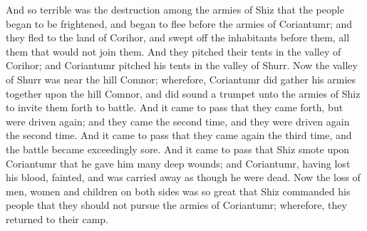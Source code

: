 And so terrible was the destruction among the armies of Shiz that the people began to be frightened, and began to flee before the armies of Coriantumr; and they fled to the land of Corihor, and swept off the inhabitants before them, all them that would not join them.
\bverse \iffalse And they pitched their tents in the valley of Corihor; and Coriantumr pitched his tents in the valley of Shurr. Now the valley of Shurr was near the hill Comnor; wherefore, Coriantumr did gather his armies together upon the hill Comnor, and did sound a trumpet unto the armies of Shiz to invite them forth to battle. \fi
And they pitched their tents in the valley of Corihor; and Coriantumr pitched his tents in the valley of Shurr. Now the valley of Shurr was near the hill Comnor; wherefore, Coriantumr did gather his armies together upon the hill Comnor, and did sound a trumpet unto the armies of Shiz to invite them forth to battle.
\bverse \iffalse And it came to pass that they came forth, but were driven again; and they came the second time, and they were driven again the second time. And it came to pass that they came again the third time, and the battle became exceedingly sore. \fi
And it came to pass that they came forth, but were driven again; and they came the second time, and they were driven again the second time. And it came to pass that they came again the third time, and the battle became exceedingly sore.
\bverse \iffalse And it came to pass that Shiz smote upon Coriantumr that he gave him many deep wounds; and Coriantumr, having lost his blood, fainted, and was carried away as though he were dead. \fi
And it came to pass that Shiz smote upon Coriantumr that he gave him many deep wounds; and Coriantumr, having lost his blood, fainted, and was carried away as though he were dead.
\bverse \iffalse Now the loss of men, women and children on both sides was so great that Shiz commanded his people that they should not pursue the armies of Coriantumr; wherefore, they returned to their camp. \fi
Now the loss of men, women and children on both sides was so great that Shiz commanded his people that they should not pursue the armies of Coriantumr; wherefore, they returned to their camp.


